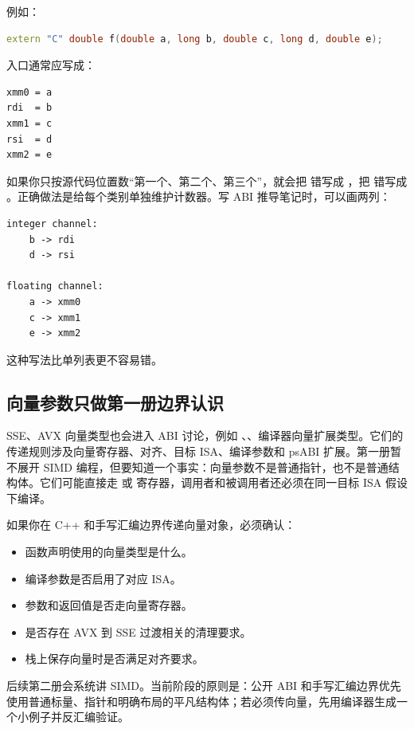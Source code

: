 例如：

\begin{lstlisting}[language=C++]
extern "C" double f(double a, long b, double c, long d, double e);
\end{lstlisting}

入口通常应写成：

\begin{lstlisting}
xmm0 = a
rdi  = b
xmm1 = c
rsi  = d
xmm2 = e
\end{lstlisting}

如果你只按源代码位置数“第一个、第二个、第三个”，就会把  错写成 ，把  错写成 。正确做法是给每个类别单独维护计数器。写 ABI 推导笔记时，可以画两列：

\begin{lstlisting}
integer channel:
    b -> rdi
    d -> rsi

floating channel:
    a -> xmm0
    c -> xmm1
    e -> xmm2
\end{lstlisting}

这种写法比单列表更不容易错。

\subsection{向量参数只做第一册边界认识}

SSE、AVX 向量类型也会进入 ABI 讨论，例如 、、编译器向量扩展类型。它们的传递规则涉及向量寄存器、对齐、目标 ISA、编译参数和 psABI 扩展。第一册暂不展开 SIMD 编程，但要知道一个事实：向量参数不是普通指针，也不是普通结构体。它们可能直接走  或  寄存器，调用者和被调用者还必须在同一目标 ISA 假设下编译。

如果你在 C++ 和手写汇编边界传递向量对象，必须确认：

\begin{itemize}
  \item 函数声明使用的向量类型是什么。
  \item 编译参数是否启用了对应 ISA。
  \item 参数和返回值是否走向量寄存器。
  \item 是否存在 AVX 到 SSE 过渡相关的清理要求。
  \item 栈上保存向量时是否满足对齐要求。
\end{itemize}

后续第二册会系统讲 SIMD。当前阶段的原则是：公开 ABI 和手写汇编边界优先使用普通标量、指针和明确布局的平凡结构体；若必须传向量，先用编译器生成一个小例子并反汇编验证。


